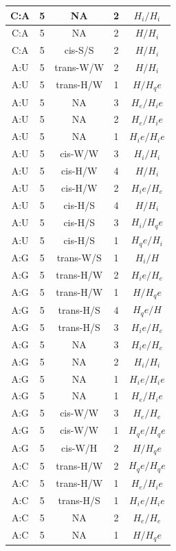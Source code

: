 \begin{center}
\begin{longtable}{c|c|c|c|c}
C:A & 5 & NA & 2 & $H_i/H_i$ \\  \hline
C:A & 5 & NA & 2 & $H/H_i$ \\  \hline
C:A & 5 & cis-S/S & 2 & $H/H_i$ \\  \hline
A:U & 5 & trans-W/W & 2 & $H/H_i$ \\  \hline
A:U & 5 & trans-H/W & 1 & $H/H_qe$ \\  \hline
A:U & 5 & NA & 3 & $H_e/H_ie$ \\  \hline
A:U & 5 & NA & 2 & $H_e/H_ie$ \\  \hline
A:U & 5 & NA & 1 & $H_ie/H_ie$ \\  \hline
A:U & 5 & cis-W/W & 3 & $H_i/H_i$ \\  \hline
A:U & 5 & cis-H/W & 4 & $H/H_i$ \\  \hline
A:U & 5 & cis-H/W & 2 & $H_ie/H_e$ \\  \hline
A:U & 5 & cis-H/S & 4 & $H/H_i$ \\  \hline
A:U & 5 & cis-H/S & 3 & $H_i/H_qe$ \\  \hline
A:U & 5 & cis-H/S & 1 & $H_qe/H_i$ \\  \hline
A:G & 5 & trans-W/S & 1 & $H_i/H$ \\  \hline
A:G & 5 & trans-H/W & 2 & $H_ie/H_e$ \\  \hline
A:G & 5 & trans-H/W & 1 & $H/H_qe$ \\  \hline
A:G & 5 & trans-H/S & 4 & $H_qe/H$ \\  \hline
A:G & 5 & trans-H/S & 3 & $H_ie/H_e$ \\  \hline
A:G & 5 & NA & 3 & $H_ie/H_e$ \\  \hline
A:G & 5 & NA & 2 & $H_i/H_i$ \\  \hline
A:G & 5 & NA & 1 & $H_ie/H_ie$ \\  \hline
A:G & 5 & NA & 1 & $H_e/H_ie$ \\  \hline
A:G & 5 & cis-W/W & 3 & $H_e/H_e$ \\  \hline
A:G & 5 & cis-W/W & 1 & $H_qe/H_qe$ \\  \hline
A:G & 5 & cis-W/H & 2 & $H/H_qe$ \\  \hline
A:C & 5 & trans-H/W & 2 & $H_qe/H_qe$ \\  \hline
A:C & 5 & trans-H/W & 1 & $H_e/H_ie$ \\  \hline
A:C & 5 & trans-H/S & 1 & $H_ie/H_ie$ \\  \hline
A:C & 5 & NA & 2 & $H_e/H_e$ \\  \hline
A:C & 5 & NA & 1 & $H/H_qe$ \\  \hline

\end{longtable}
\end{center}
